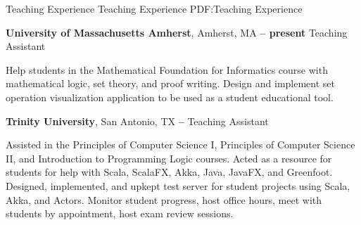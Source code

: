 \Section
{Teaching Experience}
{Teaching Experience}
{PDF:Teaching Experience}

\Entry
\textbf{University of Massachusetts Amherst},
Amherst, MA
\dotfill
\textbf{ -- present}
\SubEntry
\Gap
Teaching Assistant
\begin{Detail}
    \SubBulletItem
    Help students in the Mathematical Foundation for Informatics course with mathematical logic, set theory, and proof writing.
    \SubBulletItem
    Design and implement set operation visualization application to be used as a student educational tool.
\end{Detail}

\BigGap
\Entry
\textbf{Trinity University},
San Antonio, TX
\dotfill
\textbf{ -- }
\SubEntry
\Gap
Teaching Assistant
\begin{Detail}
    \SubBulletItem
    Assisted in the Principles of Computer Science I, Principles of Computer Science II, and Introduction to Programming Logic courses.
    \SubBulletItem
    Acted as a resource for students for help with Scala, ScalaFX, Akka, Java, JavaFX, and Greenfoot.
    \SubBulletItem
    Designed, implemented, and upkept test server for student projects using Scala, Akka, and Actors.
    \SubBulletItem
    Monitor student progress, host office hours, meet with students by appointment, host exam review sessions.
\end{Detail}
